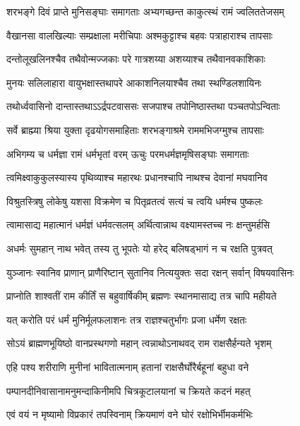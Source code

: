 
\twolineshloka
{शरभङ्गे दिवं प्राप्ते मुनिसङ्घाः समागताः}
{अभ्यगच्छन्त काकुत्स्थं रामं ज्वलिततेजसम्} %

\twolineshloka
{वैखानसा वालखिल्याः सम्प्रक्षाला मरीचिपाः}
{अश्मकुट्टाश्च बहवः पत्राहाराश्च तापसाः} %

\twolineshloka
{दन्तोलूखलिनश्चैव तथैवोन्मज्जकाः परे}
{गात्रशय्या अशय्याश्च तथैवानवकाशिकाः} %

\twolineshloka
{मुनयः सलिलाहारा वायुभक्षास्तथापरे}
{आकाशनिलयाश्चैव तथा स्थण्डिलशायिनः} %

\twolineshloka
{तथोर्ध्ववासिनो दान्तास्तथाऽऽर्द्रपटवाससः}
{सजपाश्च तपोनिष्ठास्तथा पञ्चतपोऽन्विताः} %

\twolineshloka
{सर्वे ब्राह्म्या श्रिया युक्ता दृढयोगसमाहिताः}
{शरभङ्गाश्रमे राममभिजग्मुश्च तापसाः} %

\twolineshloka
{अभिगम्य च धर्मज्ञा रामं धर्मभृतां वरम्}
{ऊचुः परमधर्मज्ञमृषिसङ्घाः समागताः} %

\twolineshloka
{त्वमिक्ष्वाकुकुलस्यास्य पृथिव्याश्च महारथः}
{प्रधानश्चापि नाथश्च देवानां मघवानिव} %

\twolineshloka
{विश्रुतस्त्रिषु लोकेषु यशसा विक्रमेण च}
{पितृव्रतत्वं सत्यं च त्वयि धर्मश्च पुष्कलः} %

\twolineshloka
{त्वामासाद्य महात्मानं धर्मज्ञं धर्मवत्सलम्}
{अर्थित्वान्नाथ वक्ष्यामस्तच्च नः क्षन्तुमर्हसि} %

\twolineshloka
{अधर्मः सुमहान् नाथ भवेत् तस्य तु भूपतेः}
{यो हरेद् बलिषड्भागं न च रक्षति पुत्रवत्} %

\twolineshloka
{युञ्जानः स्वानिव प्राणान् प्राणैरिष्टान् सुतानिव}
{नित्ययुक्तः सदा रक्षन् सर्वान् विषयवासिनः} %

\twolineshloka
{प्राप्नोति शाश्वतीं राम कीर्तिं स बहुवार्षिकीम्}
{ब्रह्मणः स्थानमासाद्य तत्र चापि महीयते} %

\twolineshloka
{यत् करोति परं धर्मं मुनिर्मूलफलाशनः}
{तत्र राज्ञश्चतुर्भागः प्रजा धर्मेण रक्षतः} %

\twolineshloka
{सोऽयं ब्राह्मणभूयिष्ठो वानप्रस्थगणो महान्}
{त्वन्नाथोऽनाथवद् राम राक्षसैर्हन्यते भृशम्} %

\twolineshloka
{एहि पश्य शरीराणि मुनीनां भावितात्मनाम्}
{हतानां राक्षसैर्घोरैर्बहूनां बहुधा वने} %

\twolineshloka
{पम्पानदीनिवासानामनुमन्दाकिनीमपि}
{चित्रकूटालयानां च क्रियते कदनं महत्} %

\twolineshloka
{एवं वयं न मृष्यामो विप्रकारं तपस्विनाम्}
{क्रियमाणं वने घोरं रक्षोभिर्भीमकर्मभिः} %


